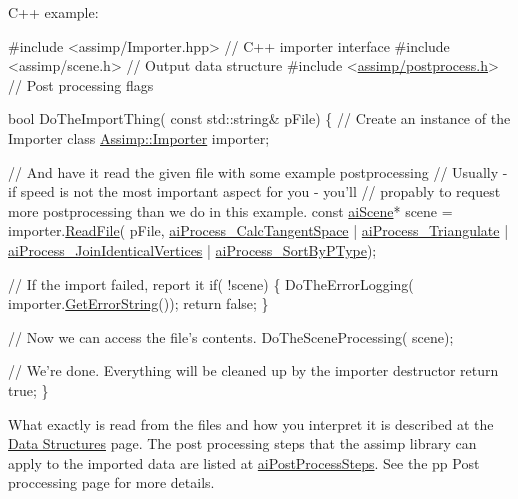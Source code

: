 C++ example\+: 
\begin{DoxyCode}
\textcolor{preprocessor}{#include <assimp/Importer.hpp>}      \textcolor{comment}{// C++ importer interface}
\textcolor{preprocessor}{#include <assimp/scene.h>}           \textcolor{comment}{// Output data structure}
\textcolor{preprocessor}{#include <\hyperlink{postprocess_8h}{assimp/postprocess.h}>}     \textcolor{comment}{// Post processing flags}

\textcolor{keywordtype}{bool} DoTheImportThing( \textcolor{keyword}{const} std::string& pFile)
\{
  \textcolor{comment}{// Create an instance of the Importer class}
  \hyperlink{class_assimp_1_1_importer}{Assimp::Importer} importer;

  \textcolor{comment}{// And have it read the given file with some example postprocessing}
  \textcolor{comment}{// Usually - if speed is not the most important aspect for you - you'll }
  \textcolor{comment}{// propably to request more postprocessing than we do in this example.}
  \textcolor{keyword}{const} \hyperlink{structai_scene}{aiScene}* scene = importer.\hyperlink{class_assimp_1_1_importer_afa338a135a56956bd5deb7d238498dde}{ReadFile}( pFile, 
    \hyperlink{postprocess_8h_a64795260b95f5a4b3f3dc1be4f52e410a8857a0e30688127a82c7b8939958c6dc}{aiProcess\_CalcTangentSpace}       | 
    \hyperlink{postprocess_8h_a64795260b95f5a4b3f3dc1be4f52e410a9c3de834f0307f31fa2b1b6d05dd592b}{aiProcess\_Triangulate}            |
    \hyperlink{postprocess_8h_a64795260b95f5a4b3f3dc1be4f52e410a444a6c9d8b63e6dc9e1e2e1edd3cbcd4}{aiProcess\_JoinIdenticalVertices}  |
    \hyperlink{postprocess_8h_a64795260b95f5a4b3f3dc1be4f52e410ab4484f73635d633cd79973bac1431ed6}{aiProcess\_SortByPType});
  
  \textcolor{comment}{// If the import failed, report it}
  \textcolor{keywordflow}{if}( !scene)
  \{
    DoTheErrorLogging( importer.\hyperlink{class_assimp_1_1_importer_ad6b2c203d69dd00708674c759485db1a}{GetErrorString}());
    \textcolor{keywordflow}{return} \textcolor{keyword}{false};
  \}

  \textcolor{comment}{// Now we can access the file's contents. }
  DoTheSceneProcessing( scene);

  \textcolor{comment}{// We're done. Everything will be cleaned up by the importer destructor}
  \textcolor{keywordflow}{return} \textcolor{keyword}{true};
\}
\end{DoxyCode}


What exactly is read from the files and how you interpret it is described at the \hyperlink{data}{Data Structures} page.  The post processing steps that the assimp library can apply to the imported data are listed at \hyperlink{postprocess_8h_a64795260b95f5a4b3f3dc1be4f52e410}{ai\+Post\+Process\+Steps}. See the pp Post proccessing page for more details.

